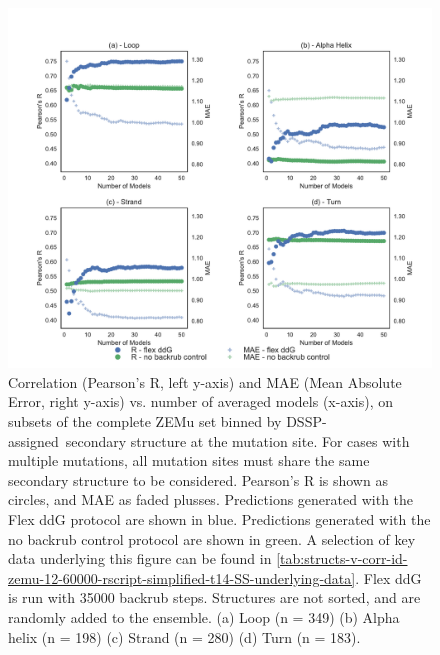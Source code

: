 \begin{figure}
  \includegraphics[width=\textwidth,keepaspectratio]{structs-v-corr-id-zemu-12-60000-rscript-simplified-t14-SS.pdf}
  \caption[]{
    Correlation (Pearson's R, left y-axis) and MAE (Mean Absolute Error, right y-axis) vs. number of averaged models (x-axis), on subsets of the complete ZEMu set binned by DSSP-assigned\cite{kabsch_dictionary_1983,joosten_series_2011}\ secondary structure at the mutation site. For cases with multiple mutations, all mutation sites must share the same secondary structure to be considered.
    Pearson's R is shown as circles, and MAE as faded plusses.
Predictions generated with the Flex ddG protocol are shown in blue.
Predictions generated with the no backrub control protocol are shown in green.
    A selection of key data underlying this figure can be found in \cref{tab:structs-v-corr-id-zemu-12-60000-rscript-simplified-t14-SS-underlying-data}. Flex ddG is run with 35000 backrub steps.
    Structures are not sorted, and are randomly added to the ensemble.
    (a) Loop (n = 349)
    (b) Alpha helix (n = 198)
    (c) Strand (n = 280)
    (d) Turn (n = 183).
  } \label{fig:structs-v-corr-id-zemu-12-60000-rscript-simplified-t14-SS}
\end{figure}
